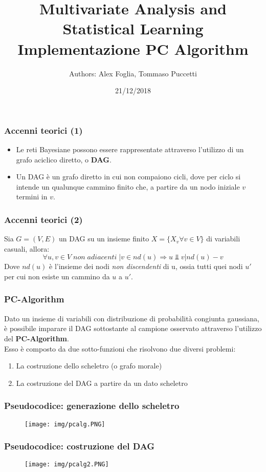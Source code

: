 \documentclass[xcolor ={table,usenames,dvipsnames}]{beamer}
\title{Multivariate Analysis and Statistical Learning \\ Implementazione PC Algorithm}
\author{Authors: Alex Foglia, Tommaso Puccetti}
\institute{Universit\`a  degli Studi di Firenze}
\date{21/12/2018}
\theoremstyle{definition}
\begin{document}
	
	\begin{frame}
		\maketitle
	\end{frame}

	\begin{frame}
		\frametitle{Accenni teorici (1)}
		\begin{itemize}
			\item Le reti Bayesiane possono essere rappresentate attraverso l'utilizzo di un grafo aciclico diretto, o \textbf{DAG}.\\
			\item Un DAG è un grafo diretto in cui non compaiono cicli, dove per ciclo si intende un qualunque cammino finito che, a partire da un nodo iniziale $v$ termini in $v$.
		\end{itemize}
	\end{frame}

	\begin{frame}
		\frametitle{Accenni teorici (2)}
		Sia $G = (V,E)$ un DAG su un insieme finito $X = \{X_v \forall v \in V\}$ di variabili casuali, allora:
		$$
		\forall u,v \in V \;non\;adiacenti\;| v \in nd(u) \Rightarrow u \Perp v | nd(u) - v
		$$
		Dove $nd(u)$ è l'insieme dei nodi \emph{non discendenti} di u, ossia tutti quei nodi $u'$ per cui non esiste un cammino da $u$ a $u'$.\\
	\end{frame}

	\begin{frame}
		\frametitle{PC-Algorithm}
		Dato un insieme di variabili con distribuzione di probabilità congiunta gaussiana, è possibile imparare il DAG sottostante al campione osservato attraverso l'utilizzo del \textbf{PC-Algorithm}.\\
		Esso è composto da due sotto-funzioni che risolvono due diversi problemi:
		\begin{enumerate}
			\item La costruzione dello scheletro (o grafo morale)
			\item La costruzione del DAG a partire da un dato scheletro
		\end{enumerate}
	\end{frame}

	\begin{frame}
		\frametitle{Pseudocodice: generazione dello scheletro}
		\begin{figure}[h!]
			\centering
			\texttt{[image: img/pcalg.PNG]}
			\label{Interfacce di un CS}
		\end{figure}
	\end{frame}

	\begin{frame}
		\frametitle{Pseudocodice: costruzione del DAG}
		\begin{figure}[h!]
			\centering
			\texttt{[image: img/pcalg2.PNG]}
			\label{Interfacce di un CS}
		\end{figure}
	\end{frame}
	
\end{document}

